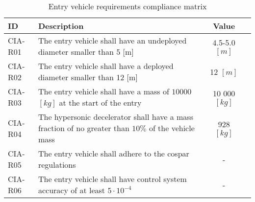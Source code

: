 \begin{table}[H]
\centering
	\caption{Entry vehicle requirements compliance matrix} 
	\label{tab:compv}
	\begin{tabular}{|p{}|p{}|c|c|}
	    \hline
	    ID          & Description   & Value &                                                                                           \\ \hline \hline
	CIA-R01 & The entry vehicle shall have an undeployed diameter smaller than 5 [m]                   & 4.5-5.0 $[m]$  & \cmark     				            \\ \hline
	CIA-R02 & The entry vehicle shall have a deployed diameter smaller than 12 [m]                     & 12 $[m]$ &  \cmark 				            \\ \hline	
	CIA-R03 & The entry vehicle shall have a mass of $10 000$ $[kg]$ at the start of the entry           & 10 000 $[kg]$ &  \cmark          				            \\ \hline
	CIA-R04 & The hypersonic decelerator shall have a mass fraction of no greater than $10\%$ of the vehicle mass	& 928 $[kg]$ & \cmark \\ \hline 
	CIA-R05 &  The entry vehicle shall adhere to the \gls{cospar} regulations  & - & \cmark \\ \hline
	CIA-R06 &  The entry vehicle shall have control system accuracy of at least $5\cdot 10^{-4}$ & - & \cmark \\ \hline
    \end{tabular}
\end{table}

\newpage
